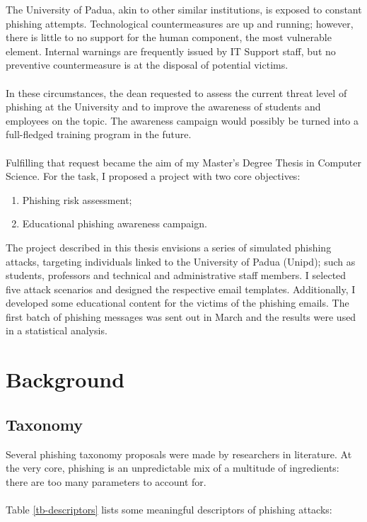 \documentclass[a4paper]{article}
\begin{document}
The University of Padua, akin to other similar institutions, is exposed to constant phishing attempts. Technological countermeasures are up and running; however, there is little to no support for the human component, the most vulnerable element. Internal warnings are frequently issued by IT Support staff, but no preventive countermeasure is at the disposal of potential victims.
\\ \\
In these circumstances, the dean requested to assess the current threat level of phishing at the University and to improve the awareness of students and employees on the topic. The awareness campaign would possibly be turned into a full-fledged training program in the future.
\\ \\
Fulfilling that request became the aim of my Master's Degree Thesis in Computer Science. For the task, I proposed a project with two core objectives:

\begin{enumerate}
    \item Phishing risk assessment;
    \item Educational phishing awareness campaign.
\end{enumerate}

\noindent
The project described in this thesis envisions a series of simulated phishing attacks, targeting individuals linked to the University of Padua (Unipd); such as students, professors and technical and administrative staff members. I selected five attack scenarios and designed the respective email templates. Additionally, I developed some educational content for the victims of the phishing emails. The first batch of phishing messages was sent out in March and the results were used in a statistical analysis.

\newpage

\section{Background}

\subsection{Taxonomy}

Several phishing taxonomy proposals were made by researchers in literature. At the very core, phishing is an unpredictable mix of a multitude of ingredients: there are too many parameters to account for. 
\\ \\
Table \ref{tb-descriptors} lists some meaningful descriptors of phishing attacks:
\end{document}
